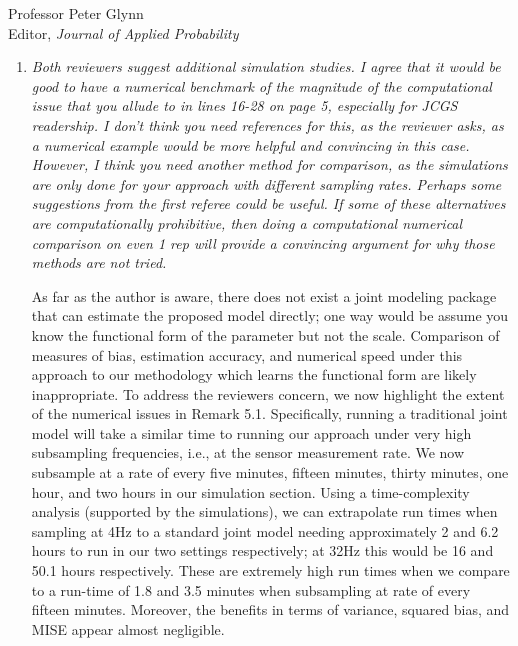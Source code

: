 \documentclass[11pt]{letter} %
\begin{document}
\begin{letter}{Professor
	Peter Glynn\\
	Editor, {\em Journal of Applied Probability}}
\begin{enumerate}
\vspace{5mm}
\textcolor{red}{To accommodate the second referee's request without making the discussion too long, we have added Remark XX and XX that provide some intuition.  We have re-written the technical proofs to first provide a sketch proof (with intuition) and then a detailed proof.  We hope this helps the reader develop intuition on the first read while giving them some helpful guidance in order to facilitate understanding of the detailed theoretical analysis.}
\vspace{5mm}

\item {\it Both reviewers suggest additional simulation studies. I agree that it would be good to have a numerical benchmark of the magnitude of the computational issue that you allude to in lines 16-28 on page 5, especially for JCGS readership. I don’t think you need references for this, as the reviewer asks, as a numerical example would be more helpful and convincing in this case. However, I think you need another method for comparison, as the simulations are only done for your approach with different sampling rates. Perhaps some suggestions from the first referee could be useful. If some of these alternatives are computationally prohibitive, then doing a computational numerical comparison on even 1 rep will provide a convincing argument for why those methods are not tried.}

\vspace{5mm}
As far as the author is aware, there does not exist a joint modeling package that can estimate the proposed model directly; one way would be assume you know the functional form of the parameter but not the scale.  Comparison of measures of bias, estimation accuracy, and numerical speed under this approach to our methodology which learns the functional form are likely inappropriate. To address the reviewers concern, we now highlight the extent of the numerical issues in Remark 5.1.  Specifically, running a traditional joint model will take a similar time to running our approach under very high subsampling frequencies, i.e., at the sensor measurement rate.  We now subsample at a rate of every five minutes, fifteen minutes, thirty minutes, one hour, and two hours in our simulation section.  Using a time-complexity analysis (supported by the simulations), we can extrapolate run times when sampling at 4Hz to a standard joint model needing approximately 2 and 6.2 hours to run in our two settings respectively; at 32Hz this would be 16 and 50.1 hours respectively. These are extremely high run times when we compare to a run-time of 1.8 and 3.5 minutes when subsampling at rate of every fifteen minutes.  Moreover, the benefits in terms of variance, squared bias, and MISE appear almost negligible.
\vspace{5mm}


\end{enumerate}
\end{letter}
\end{document}

